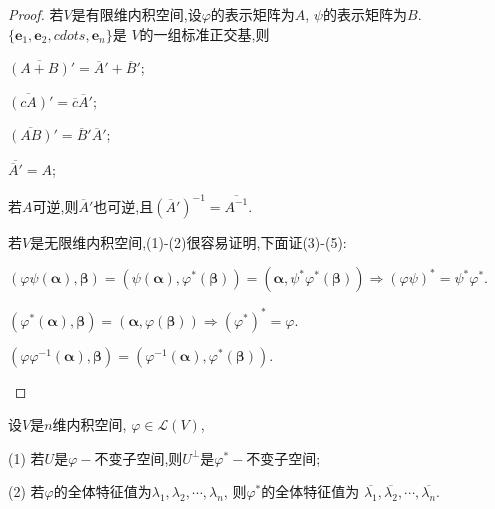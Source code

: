 \begin{proof}
若$V$是有限维内积空间,设$\varphi$的表示矩阵为$A$, $\psi$的表示矩阵为$B$.
$\{\bm{e}_1,\bm{e}_2,cdots,\bm{e}_n\}$是
$V$的一组标准正交基,则
\begin{asparaenum}[(1)]
  \item $\overline{(A+B)}'=\overline{A}'+\overline{B}'$;
  \item $\overline{(cA)}'=\overline{c}\overline{A}'$;
  \item $\overline{(AB)}'=\overline{B}'\overline{A}'$;
  \item $\overline{\overline{A}'}=A$;
  \item 若$A$可逆,则$\overline{A}'$也可逆,且$(\overline{A}')^{-1}=\overline{A^{-1}}$.
\end{asparaenum}

若$V$是无限维内积空间,(1)-(2)很容易证明,下面证(3)-(5):
\begin{asparaenum}[(1)]
  \setcounter{enumi}{2}%
  \item $(\varphi\psi(\bm{\alpha}),\bm{\beta})=
  (\psi(\bm{\alpha}),\varphi^*(\bm{\beta}))=
  (\bm{\alpha},\psi^*\varphi^*(\bm{\beta})) \Longrightarrow
    (\varphi\psi)^*=\psi^*\varphi^*.$
  \item $(\varphi^*(\bm{\alpha}),\bm{\beta})=(\bm{\alpha},\varphi(\bm{\beta}))
    \Longrightarrow (\varphi^*)^*=\varphi.$
  \item $(\varphi\varphi^{-1}(\bm{\alpha}),\bm{\beta})=
    (\varphi^{-1}(\bm{\alpha}),\varphi^*(\bm{\beta})).$
\end{asparaenum}
\end{proof}

\begin{question}\label{qus:accompany}
  设$V$是$n$维内积空间, $\varphi\in \mathscr{L}(V)$,

  (1) 若$U$是$\varphi-$不变子空间,则$U^{\perp}$是$\varphi^*-$不变子空间;

  (2) 若$\varphi$的全体特征值为$\lambda_1,\lambda_2,\cdots,\lambda_n$,
  则$\varphi^*$的全体特征值为
  $\overline{\lambda_1},\overline{\lambda_2},\cdots,\overline{\lambda_n}$.
\end{question}

